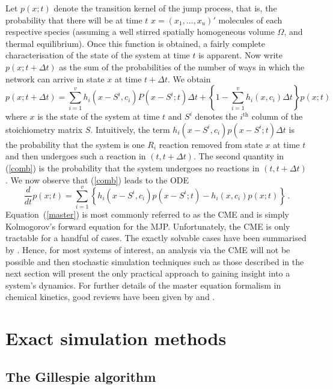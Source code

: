 \documentclass[12pt, DIV12]{scrartcl}
\begin{document}
Let $p(x;t)$ denote the transition kernel of the jump process, that is, the
probability that there will be at time $t$ $x=(x_{1},\ldots ,x_{u})'$ molecules
of each respective species (assuming a well stirred spatially homogeneous volume
$\Omega$, and thermal equilibrium). Once this function is obtained, a fairly
complete characterisation of the state of the system at time $t$ is apparent.
Now write $p(x;t+\Delta t)$ as the sum of the probabilities of the number of
ways in which the network can arrive in state $x$ at time $t+\Delta t$. We
obtain
\begin{equation} \label{comb}
	p(x;t+\Delta t) = \sum_{i=1}^{v}h_{i}(x-{S}^{i},c_{i})P(x-{S}^{i};t)\Delta t+\left \{ 1-\sum_{i=1}^{v}h_{i}(x,c_{i})\Delta t\right \} p(x;t)  
\end{equation}
where $x$ is the state of the system at time $t$ and $S^{i}$ denotes the
$i^{\textrm{th}}$ column of the stoichiometry matrix $S$. Intuitively, the term
$h_{i}(x-{S}^{i},c_{i})p(x-{S}^{i};t)\Delta t$ is the probability that the
system is one $R_{i}$ reaction removed from state $x$ at time $t$ and then
undergoes such a reaction in $(t,t+\Delta t)$. The second quantity in
(\ref{comb}) is the probability that the system undergoes no reactions in
$(t,t+\Delta t)$. We now observe that (\ref{comb}) leads to the ODE
\begin{equation} \label{master}
	\frac{d}{dt}p(x;t) = \sum_{i=1}^{v}\left \{ h_{i}(x-{S}^{i},c_{i})p(x-{S}^{i};t)-h_{i}(x,c_{i})p(x;t) \right \} \, .
\end{equation}
Equation~(\ref{master}) is most commonly referred to as the CME and is simply
Kolmogorov's forward equation for the MJP. Unfortunately, the CME is only
tractable for a handful of cases. The exactly solvable cases have been
summarised by \cite{mcquarrie1967}. Hence, for most systems of interest, an
analysis via the CME will not be possible and then stochastic simulation
techniques such as those described in the next section will present the only
practical approach to gaining insight into a system's dynamics. For further
details of the master equation formalism in chemical kinetics, good reviews have
been given by \cite{kampen2001} and \cite{wilkinson2009}.

\section{Exact simulation methods}\label{sec:ssa}

\subsection{The Gillespie algorithm}
\end{document}
